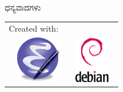 \documentclass[slidestop,compress,brown]{beamer}
\newcommand\en[1]{{\english #1}}
\begin{document}
\begin{frame}
  \begin{center}
    \vfill \vfill
    \huge{ಧನ್ಯವಾದಗಳು\linebreak}
  \end{center}
  \vfill
  \tiny{
    \begin{center}
      \begin{tabular}{l c r}
        \multicolumn{2}{l}{\en{Created with:}} \\
        \huge{\en{\XeTeX{}}} &
        \includegraphics[width=2cm,height=2cm,keepaspectratio]{emacs} &
        \includegraphics[width=2cm,height=2cm,keepaspectratio]{debian}
      \end{tabular}
    \end{center}
  }
\end{frame}
\end{document}
